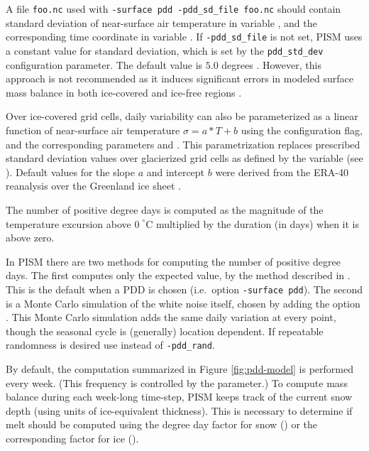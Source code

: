 \documentclass[titlepage,letterpaper,final]{scrartcl}
\begin{document}
A file \texttt{foo.nc} used with \texttt{-surface pdd -pdd_sd_file foo.nc}
should contain standard deviation of near-surface air temperature in variable
, and the corresponding time coordinate in variable
. If \texttt{-pdd_sd_file} is not set, PISM uses a constant
value for standard deviation, which is set by the \texttt{pdd_std_dev}
configuration parameter. The default value is $5.0$ degrees \cite{RitzEISMINT}.
However, this approach is not recommended as it induces significant errors in
modeled surface mass balance in both ice-covered and ice-free regions
\cite{RogozhinaRau2014, Seguinot2013}.

Over ice-covered grid cells, daily variability can also be parameterized as a linear function of near-surface air temperature $\sigma = a*T + b$ using the  configuration flag, and the corresponding parameters  and . This parametrization replaces prescribed standard deviation values over glacierized grid cells as defined by the  variable (see ). Default values for the slope $a$ and intercept $b$ were derived from the ERA-40 reanalysis over the Greenland ice sheet \cite{SeguinotRogozhina2014}.

The number of positive degree days is computed as the magnitude of the
temperature excursion above $0\!\phantom{|}^\circ \text{C}$ multiplied by the
duration (in days) when it is above zero.

In PISM there are two methods for computing the number of positive degree days.
The first computes only the expected value, by the method described in
\cite{CalovGreve05}. This is the default when a PDD is chosen (i.e.~option
\texttt{-surface~pdd}). The second is a Monte Carlo simulation of the white
noise itself, chosen by adding the option . This Monte
Carlo simulation adds the same daily variation at every point, though the
seasonal cycle is (generally) location dependent. If repeatable randomness is
desired use  instead of \texttt{-pdd_rand}.

By default, the computation summarized in Figure \ref{fig:pdd-model}
is performed every week. (This frequency is controlled by the
 parameter.) To compute mass balance
during each week-long time-step, PISM keeps track of the current snow
depth (using units of ice-equivalent thickness). This is necessary to
determine if melt should be computed using the degree day factor for
snow () or the corresponding factor for ice
().
\end{document}
